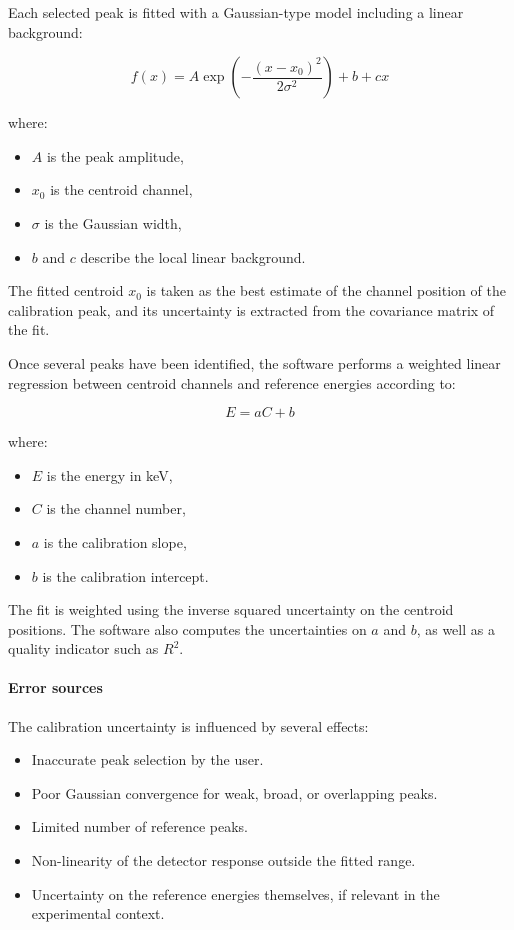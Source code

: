 Each selected peak is fitted with a Gaussian-type model including a
linear background:

\[
f(x) = A \exp\left(-\frac{(x-x_0)^2}{2\sigma^2}\right) + b + cx
\]

where:

\begin{itemize}
\tightlist
\item
  \(A\) is the peak amplitude,
\item
  \(x_0\) is the centroid channel,
\item
  \(\sigma\) is the Gaussian width,
\item
  \(b\) and \(c\) describe the local linear background.
\end{itemize}

The fitted centroid \(x_0\) is taken as the best estimate of the channel
position of the calibration peak, and its uncertainty is extracted from
the covariance matrix of the fit.

Once several peaks have been identified, the software performs a
weighted linear regression between centroid channels and reference
energies according to:

\[
E = aC + b
\]

where:

\begin{itemize}
\tightlist
\item
  \(E\) is the energy in keV,
\item
  \(C\) is the channel number,
\item
  \(a\) is the calibration slope,
\item
  \(b\) is the calibration intercept.
\end{itemize}

The fit is weighted using the inverse squared uncertainty on the
centroid positions. The software also computes the uncertainties on
\(a\) and \(b\), as well as a quality indicator such as \(R^2\).

\hypertarget{error-sources-1}{%
\paragraph{Error sources}\label{error-sources-1}}

The calibration uncertainty is influenced by several effects:

\begin{itemize}
\tightlist
\item
  Inaccurate peak selection by the user.
\item
  Poor Gaussian convergence for weak, broad, or overlapping peaks.
\item
  Limited number of reference peaks.
\item
  Non-linearity of the detector response outside the fitted range.
\item
  Uncertainty on the reference energies themselves, if relevant in the
  experimental context.
\end{itemize}

